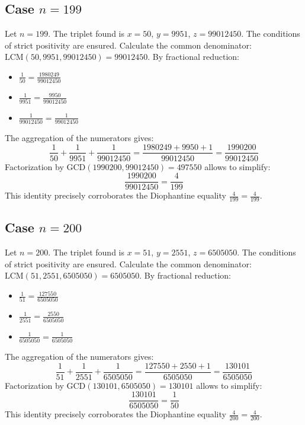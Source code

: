 \documentclass[11pt,a4paper]{article}
\begin{document}
\subsection{Case $n = 199$}
Let $n = 199$. The triplet found is $x = 50$, $y = 9951$, $z = 99012450$.
The conditions of strict positivity are ensured.
Calculate the common denominator: $\text{LCM}(50, 9951, 99012450) = 99012450$.
By fractional reduction:
\begin{itemize}
    \item $\frac{1}{50} = \frac{1980249}{99012450}$
    \item $\frac{1}{9951} = \frac{9950}{99012450}$
    \item $\frac{1}{99012450} = \frac{1}{99012450}$
\end{itemize}
The aggregation of the numerators gives:
$$ \frac{1}{50} + \frac{1}{9951} + \frac{1}{99012450} = \frac{1980249 + 9950 + 1}{99012450} = \frac{1990200}{99012450} $$
Factorization by $\text{GCD}(1990200, 99012450) = 497550$ allows to simplify:
$$ \frac{1990200}{99012450} = \frac{4}{199} $$
This identity precisely corroborates the Diophantine equality $\frac{4}{199} = \frac{4}{199}$.

\subsection{Case $n = 200$}
Let $n = 200$. The triplet found is $x = 51$, $y = 2551$, $z = 6505050$.
The conditions of strict positivity are ensured.
Calculate the common denominator: $\text{LCM}(51, 2551, 6505050) = 6505050$.
By fractional reduction:
\begin{itemize}
    \item $\frac{1}{51} = \frac{127550}{6505050}$
    \item $\frac{1}{2551} = \frac{2550}{6505050}$
    \item $\frac{1}{6505050} = \frac{1}{6505050}$
\end{itemize}
The aggregation of the numerators gives:
$$ \frac{1}{51} + \frac{1}{2551} + \frac{1}{6505050} = \frac{127550 + 2550 + 1}{6505050} = \frac{130101}{6505050} $$
Factorization by $\text{GCD}(130101, 6505050) = 130101$ allows to simplify:
$$ \frac{130101}{6505050} = \frac{1}{50} $$
This identity precisely corroborates the Diophantine equality $\frac{4}{200} = \frac{4}{200}$.
\end{document}
